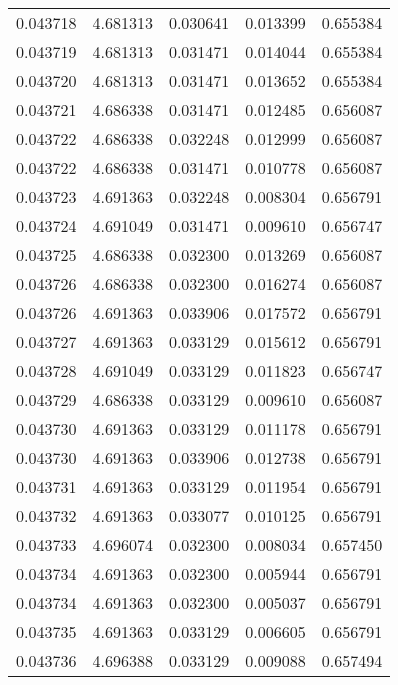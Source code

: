\begin{tabular}{lrrrr}
0.043718    &  4.681313 &  0.030641 &  0.013399 &             0.655384 \\
0.043719    &  4.681313 &  0.031471 &  0.014044 &             0.655384 \\
0.043720    &  4.681313 &  0.031471 &  0.013652 &             0.655384 \\
0.043721    &  4.686338 &  0.031471 &  0.012485 &             0.656087 \\
0.043722    &  4.686338 &  0.032248 &  0.012999 &             0.656087 \\
0.043722    &  4.686338 &  0.031471 &  0.010778 &             0.656087 \\
0.043723    &  4.691363 &  0.032248 &  0.008304 &             0.656791 \\
0.043724    &  4.691049 &  0.031471 &  0.009610 &             0.656747 \\
0.043725    &  4.686338 &  0.032300 &  0.013269 &             0.656087 \\
0.043726    &  4.686338 &  0.032300 &  0.016274 &             0.656087 \\
0.043726    &  4.691363 &  0.033906 &  0.017572 &             0.656791 \\
0.043727    &  4.691363 &  0.033129 &  0.015612 &             0.656791 \\
0.043728    &  4.691049 &  0.033129 &  0.011823 &             0.656747 \\
0.043729    &  4.686338 &  0.033129 &  0.009610 &             0.656087 \\
0.043730    &  4.691363 &  0.033129 &  0.011178 &             0.656791 \\
0.043730    &  4.691363 &  0.033906 &  0.012738 &             0.656791 \\
0.043731    &  4.691363 &  0.033129 &  0.011954 &             0.656791 \\
0.043732    &  4.691363 &  0.033077 &  0.010125 &             0.656791 \\
0.043733    &  4.696074 &  0.032300 &  0.008034 &             0.657450 \\
0.043734    &  4.691363 &  0.032300 &  0.005944 &             0.656791 \\
0.043734    &  4.691363 &  0.032300 &  0.005037 &             0.656791 \\
0.043735    &  4.691363 &  0.033129 &  0.006605 &             0.656791 \\
0.043736    &  4.696388 &  0.033129 &  0.009088 &             0.657494 \\

\end{tabular}
